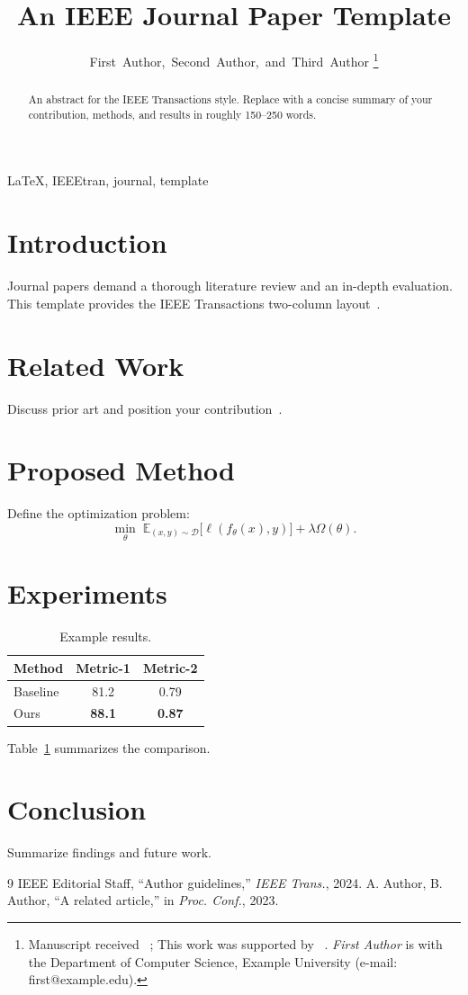 \documentclass[journal]{IEEEtran}
\title{An IEEE Journal Paper Template}
\author{First~Author,~Second~Author,~and~Third~Author%
\thanks{Manuscript received ~; This work was supported by ~.%
\newline \textit{First Author} is with the Department of Computer Science,
Example University (e-mail: first@example.edu).}}
\begin{document}
\maketitle

\begin{abstract}
An abstract for the IEEE Transactions style. Replace with a concise summary
of your contribution, methods, and results in roughly 150--250 words.
\end{abstract}

\begin{IEEEkeywords}
LaTeX, IEEEtran, journal, template
\end{IEEEkeywords}

\section{Introduction}
Journal papers demand a thorough literature review and an in-depth
evaluation. This template provides the IEEE Transactions two-column
layout~\cite{ref1}.

\section{Related Work}
Discuss prior art and position your contribution~\cite{ref2}.

\section{Proposed Method}
Define the optimization problem:
\begin{equation}
  \min_{\theta} \; \mathbb{E}_{(x,y)\sim\mathcal{D}}
  \big[\ell(f_\theta(x), y)\big] + \lambda\Omega(\theta).
\end{equation}

\section{Experiments}
\begin{table}[!t]
  \centering
  \caption{Example results.}
  \label{tab:r}
  \begin{tabular}{lcc}
    \toprule
    Method & Metric-1 & Metric-2 \\
    \midrule
    Baseline & 81.2 & 0.79 \\
    Ours     & \textbf{88.1} & \textbf{0.87} \\
    \bottomrule
  \end{tabular}
\end{table}
Table~\ref{tab:r} summarizes the comparison.

\section{Conclusion}
Summarize findings and future work.

\begin{thebibliography}{9}
 IEEE Editorial Staff, ``Author guidelines,'' \emph{IEEE Trans.}, 2024.
 A. Author, B. Author, ``A related article,'' in \emph{Proc. Conf.}, 2023.
\end{thebibliography}
\end{document}
